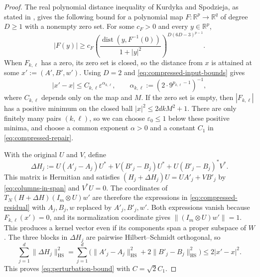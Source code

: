 \begin{proof}
The real polynomial distance inequality of Kurdyka and Spodzieja, as stated in \cite[p.~2, \textup{(KS2)}]{KSS16}, gives the following bound for a polynomial map $F:\mathbb R^p\to\mathbb R^q$ of degree $D\ge1$ with a nonempty zero set.
For some $c_F>0$ and every $y\in\mathbb R^p$,
\[
 |F(y)|\ge c_F
 \left(\frac{\operatorname{dist}(y,F^{-1}(0))}{1+|y|^2}\right)^{D(6D-3)^{p-1}}.
\]
When $F_{k,\ell}$ has a zero, its zero set is closed, so the distance from $x$ is attained at some $x':=(A',B',w')$.
Using $D=2$ and \eqref{eq:compressed-input-bounds} gives
\begin{equation}\label{eq:compressed-repair}
 |x'-x|\le C_{k,\ell}\varepsilon^{\alpha_{k,\ell}},
 \qquad
 \alpha_{k,\ell}:=(2\cdot 9^{p_{k,\ell}-1})^{-1},
\end{equation}
where $C_{k,\ell}$ depends only on the map and $M$.
If the zero set is empty, then $|F_{k,\ell}|$ has a positive minimum on the closed ball $|x|^2\le 2dkM^2+1$.
There are only finitely many pairs $(k,\ell)$, so we can choose $\varepsilon_0\le1$ below these positive minima, and choose a common exponent $\alpha>0$ and a constant $C_1$ in \eqref{eq:compressed-repair}.

With the original $U$ and $V$, define
\[
 \Delta H_j:=U(A'_j-A_j)U^*+V(B'_j-B_j)U^*+U(B'_j-B_j)^*V^*.
\]
This matrix is Hermitian and satisfies $(H_j+\Delta H_j)U=UA'_j+VB'_j$ by \eqref{eq:columns-in-span} and $V^*U=0$.
The coordinates of $T_N(H+\Delta H)(I_m\otimes U)w'$ are therefore the expressions in \eqref{eq:compressed-residual} with $A_j,B_j,w$ replaced by $A'_j,B'_j,w'$.
Both expressions vanish because $F_{k,\ell}(x')=0$, and its normalization coordinate gives $\|(I_m\otimes U)w'\|=1$.
This produces a kernel vector even if its components span a proper subspace of $W$.
The three blocks in $\Delta H_j$ are pairwise Hilbert--Schmidt orthogonal, so
\[
 \sum_{j=1}^d\|\Delta H_j\|_{\mathrm{HS}}^2
 =\sum_{j=1}^d\big(\|A'_j-A_j\|_{\mathrm{HS}}^2
                  +2\|B'_j-B_j\|_{\mathrm{HS}}^2\big)
 \le 2|x'-x|^2.
\]
This proves \eqref{eq:perturbation-bound} with $C=\sqrt{2}C_1$.
\end{proof}
